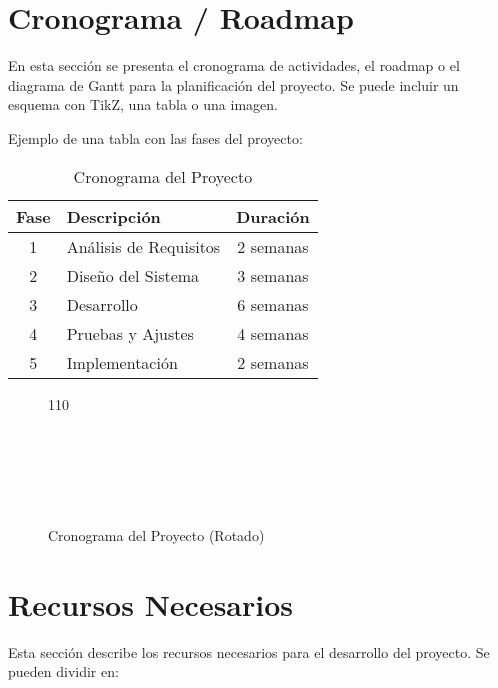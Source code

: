 \section{Cronograma / Roadmap}

En esta sección se presenta el cronograma de actividades, el roadmap o el diagrama de Gantt para la planificación del proyecto. Se puede incluir un esquema con TikZ, una tabla o una imagen.

Ejemplo de una tabla con las fases del proyecto:

\begin{table}[h] 
	\centering 
	\begin{tabular}{|c|l|c|}
		\hline
		\textbf{Fase} & \textbf{Descripción} & \textbf{Duración} \\ \hline
		1 & Análisis de Requisitos & 2 semanas \\ \hline
		2 & Diseño del Sistema & 3 semanas \\ \hline
		3 & Desarrollo & 6 semanas \\ \hline
		4 & Pruebas y Ajustes & 4 semanas \\ \hline
		5 & Implementación & 2 semanas \\ \hline
	\end{tabular} 
	\caption{Cronograma del Proyecto} 
\end{table}


\begin{sidewaysfigure}
	\centering
	\begin{ganttchart}[
		x unit=1.5cm,
		y unit chart=0.8cm
		]{1}{10}
		 \\
		 \\
		 \\
		 \\
		 \\
		 \\
	\end{ganttchart}
	\caption{Cronograma del Proyecto (Rotado)}
\end{sidewaysfigure}




\section{Recursos Necesarios}

Esta sección describe los recursos necesarios para el desarrollo del proyecto. Se pueden dividir en:

